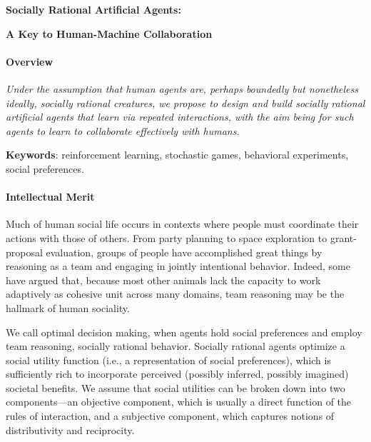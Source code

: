 
\centerline{\Large \bf Socially Rational Artificial Agents:}

\vspace{\down}
\centerline{\large \bf A Key to Human-Machine Collaboration}

\vspace{\up}
\paragraph{Overview}

\emph{Under the assumption that human agents are, perhaps boundedly
  but nonetheless ideally, socially rational creatures, we propose to
  design and build socially rational artificial agents that learn via
  repeated interactions, with the aim being for such agents to learn
  to collaborate effectively with humans.}



{\bf Keywords}: reinforcement learning, stochastic games, behavioral experiments, social preferences.

\vspace{\up}
\paragraph{Intellectual Merit}

Much of human social life occurs in contexts where people must
coordinate their actions with those of others.  From party planning to
space exploration to grant-proposal evaluation, groups of people have
accomplished great things by reasoning as a team and engaging in
jointly intentional behavior.  Indeed, some have argued that, because
most other animals lack the capacity to work adaptively as cohesive
unit across many domains, team reasoning may be the hallmark of human
sociality.

We call optimal decision making, when agents hold social preferences
and employ team reasoning, socially rational behavior.  Socially
rational agents optimize a social utility function (i.e., a
representation of social preferences), which is sufficiently rich to
incorporate perceived (possibly inferred, possibly imagined) societal
benefits.  We assume that social utilities can be broken down into two
components---an objective component, which is usually a direct
function of the rules of interaction, and a subjective component,
which captures notions of distributivity and reciprocity.

